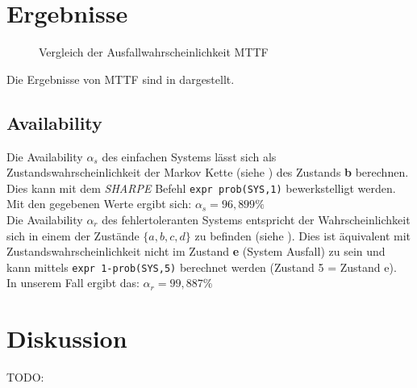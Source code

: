 \documentclass[
            a4paper
            ]{scrartcl}%
\begin{document}
\section{Ergebnisse}
\begin{figure}
\centering
{}
\caption{Vergleich der Ausfallwahrscheinlichkeit MTTF}
\label{fig:mttf_result}
\end{figure}
Die Ergebnisse von MTTF sind in  dargestellt.

\subsection{Availability}
Die Availability $\alpha_s$ des einfachen Systems lässt sich als Zustandswahrscheinlichkeit der Markov Kette (siehe ) des Zustands \textbf{b} berechnen. Dies kann mit dem \emph{SHARPE} Befehl \mbox{\texttt{expr prob(SYS,1)}} bewerkstelligt werden. \\
Mit den gegebenen Werte ergibt sich: $\alpha_s = 96,899\%$\\

Die Availability $\alpha_r$ des fehlertoleranten Systems entspricht der Wahrscheinlichkeit sich in einem der Zustände $\lbrace a, b, c, d \rbrace$ zu befinden (siehe ). Dies ist äquivalent mit Zustandswahrscheinlichkeit nicht im Zustand \textbf{e} (System Ausfall) zu sein und kann mittels \mbox{\texttt{expr 1-prob(SYS,5)}} berechnet werden (Zustand 5 = Zustand e).\\
In unserem Fall ergibt das: $\alpha_r = 99,887\%$\\
\section{Diskussion}
TODO:
\end{document}
